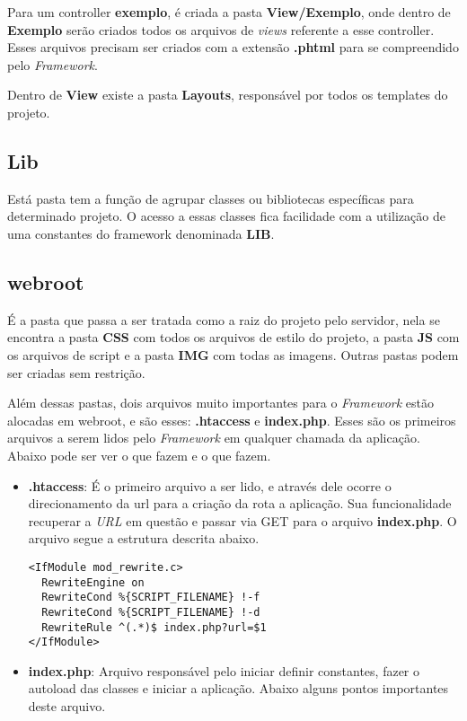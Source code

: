             Para um controller \textbf{exemplo}, é criada a pasta \textbf{View/Exemplo}, onde dentro de \textbf{Exemplo} serão criados todos os arquivos de \emph{views} referente a esse controller. Esses arquivos precisam ser criados com a extensão \textbf{.phtml} para se compreendido pelo \emph{Framework}.

            Dentro de \textbf{View} existe a pasta \textbf{Layouts}, responsável por todos os templates do projeto.

        \subsection{Lib\label{sec:app-lib}}

            Está pasta tem a função de agrupar classes ou bibliotecas específicas para determinado projeto. O acesso a essas classes fica facilidade com a utilização de uma constantes do framework denominada \textbf{LIB}.

        \subsection{webroot\label{sec:app-lib}}

            É a pasta que passa a ser tratada como a raiz do projeto pelo servidor, nela se encontra a pasta \textbf{CSS} com todos os arquivos de estilo do projeto, a pasta \textbf{JS} com os arquivos de script e a pasta \textbf{IMG} com todas as imagens. Outras pastas podem ser criadas sem restrição.

            Além dessas pastas, dois arquivos muito importantes para o \emph{Framework} estão alocadas em webroot, e são esses: \textbf{.htaccess} e \textbf{index.php}. Esses são os primeiros arquivos a serem lidos pelo \emph{Framework} em qualquer chamada da aplicação. Abaixo pode ser ver o que fazem e o que fazem.

            \begin{itemize}
                \item\textbf{.htaccess}: É o primeiro arquivo a ser lido, e através dele ocorre o direcionamento da url para a criação da rota a aplicação. Sua funcionalidade recuperar a \emph{URL} em questão e passar via GET para o arquivo \textbf{index.php}. O arquivo segue a estrutura descrita abaixo.


\begin{lstlisting}
<IfModule mod_rewrite.c>
  RewriteEngine on
  RewriteCond %{SCRIPT_FILENAME} !-f
  RewriteCond %{SCRIPT_FILENAME} !-d
  RewriteRule ^(.*)$ index.php?url=$1
</IfModule>
\end{lstlisting}


                \item\textbf{index.php}: Arquivo responsável pelo iniciar definir constantes, fazer o autoload das classes e iniciar a aplicação. Abaixo alguns pontos importantes deste arquivo.

            \end{itemize}


